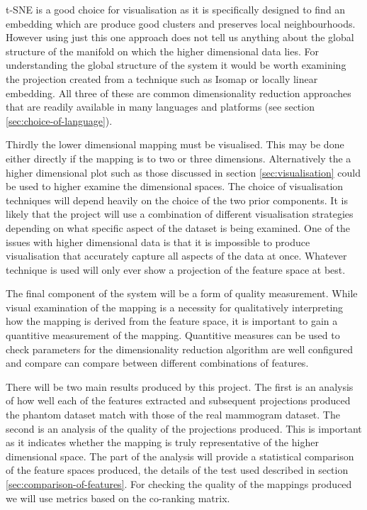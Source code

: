 t-SNE is a good choice for visualisation as it is specifically designed to find an embedding which are produce good clusters and preserves local neighbourhoods. However using just this one approach does not tell us anything about the global structure of the manifold on which the higher dimensional data lies. For understanding the global structure of the system it would be worth examining the projection created from a technique such as Isomap or locally linear embedding. All three of these are common dimensionality reduction approaches that are readily available in many languages and platforms (see section \ref{sec:choice-of-language}).

Thirdly the lower dimensional mapping must be visualised. This may be done either directly if the mapping is to two or three dimensions. Alternatively the a higher dimensional plot such as those discussed in section \ref{sec:visualisation} could be used to higher examine the dimensional spaces. The choice of visualisation techniques will depend heavily on the choice of the two prior components. It is likely that the project will use a combination of different visualisation strategies depending on what specific aspect of the dataset is being examined. One of the issues with higher dimensional data is that it is impossible to produce visualisation that accurately capture all aspects of the data at once. Whatever technique is used will only ever show a projection of the feature space at best.

The final component of the system will be a form of quality measurement. While visual examination of the mapping is a necessity for qualitatively interpreting how the mapping is derived from the feature space, it is important to gain a quantitive measurement of the mapping. Quantitive measures can be used to check parameters for the dimensionality reduction algorithm are well configured and compare can compare between different combinations of features. 

There will be two main results produced by this project. The first is an analysis of how well each of the features extracted and subsequent projections produced the phantom dataset match with those of the real mammogram dataset. The second is an analysis of the quality of the projections produced. This is important as it indicates whether the mapping is truly representative of the higher dimensional space. The part of the analysis will provide a statistical comparison of the feature spaces produced, the details of the test used described in section \ref{sec:comparison-of-features}. For checking the quality of the mappings produced we will use metrics based on the co-ranking matrix.

